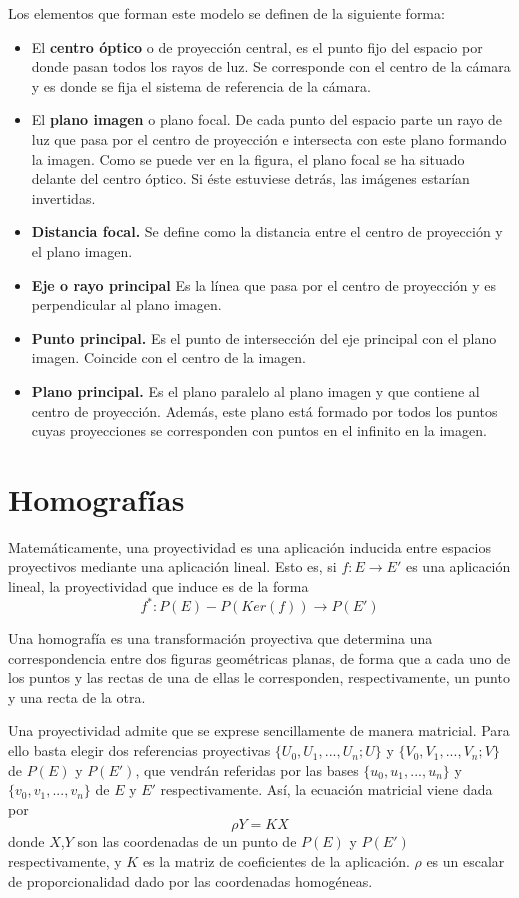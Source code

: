 Los elementos que forman este modelo se definen de la siguiente forma:
\begin{itemize}
\item El \textbf{centro óptico} o de proyección central, es el punto fijo del espacio por donde pasan todos los rayos de luz. Se corresponde con el centro de la cámara y es donde se fija el sistema de referencia de la cámara.
\item El \textbf{plano imagen} o plano focal. De cada punto del espacio parte un rayo de luz que pasa por el centro de proyección e intersecta con este plano formando la imagen. Como se puede ver en la figura, el plano focal se ha situado delante del centro
  óptico. Si éste estuviese detrás, las imágenes estarían invertidas.
\item \textbf{Distancia focal.} Se define como la distancia entre el centro de proyección y el plano imagen.
\item \textbf{Eje o rayo principal} Es la línea que pasa por el centro de proyección y es perpendicular al plano imagen.
\item \textbf{Punto principal.} Es el punto de intersección del eje principal con el plano imagen. Coincide con el centro de la imagen.
\item \textbf{Plano principal.} Es el plano paralelo al plano imagen y que contiene al centro de proyección. Además, este plano está formado por todos los puntos cuyas proyecciones se corresponden con puntos en el infinito en la imagen.
\end{itemize}

\section{Homografías}
Matemáticamente, una proyectividad es una aplicación inducida entre espacios proyectivos mediante una aplicación lineal. Esto es, si $f:E\rightarrow E'$ es una aplicación lineal, la proyectividad que induce es de la forma 
\begin{equation}
f^*:P(E)- P(Ker(f)) \rightarrow P(E')
\end{equation}

Una homografía es una transformación proyectiva que determina una correspondencia entre dos figuras geométricas planas, de forma que a cada uno de los puntos y las rectas de una de ellas le corresponden, respectivamente, un punto y una recta de la otra.

Una proyectividad admite que se exprese sencillamente de manera matricial. Para ello basta elegir dos referencias proyectivas $\{U_0,U_1,...,U_n;U\}$ y $\{V_0,V_1,...,V_n;V\}$ de $P(E)$ y $P(E')$, que vendrán referidas por las bases $\{u_0,u_1,...,u_n\}$ y $\{v_0,v_1,...,v_n\}$ de $E$ y $E'$ respectivamente. Así, la ecuación matricial viene dada por 
\begin{equation}
\rho Y = KX
\end{equation}
donde $X$,$Y$ son las coordenadas de un punto de $P(E)$ y $P(E')$ respectivamente, y $K$ es la matriz de coeficientes de la aplicación. $\rho$ es un escalar de proporcionalidad dado por las coordenadas homogéneas.




